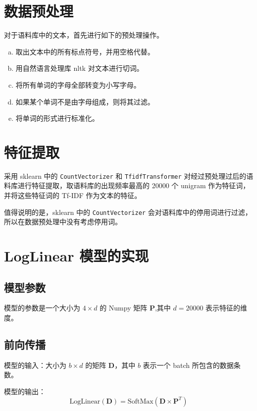 \documentclass[12pt,letterpaper]{article}
\begin{document}
\section{数据预处理}

对于语料库中的文本，首先进行如下的预处理操作。

\begin{enumerate}[a).]
    \item 取出文本中的所有标点符号，并用空格代替。
    \item 用自然语言处理库 nltk 对文本进行切词。
    \item 将所有单词的字母全部转变为小写字母。
    \item 如果某个单词不是由字母组成，则将其过滤。
    \item 将单词的形式进行标准化。
\end{enumerate}

\section{特征提取}

采用 sklearn 中的 \verb|CountVectorizer| 和 \verb|TfidfTransformer| 对经过预处理过后的语料库进行特征提取，取语料库的出现频率最高的 20000 个 unigram 作为特征词，并将这些特征词的 Tf-IDF 作为文本的特征。

值得说明的是，sklearn 中的 \verb|CountVectorizer| 会对语料库中的停用词进行过滤，所以在数据预处理中没有考虑停用词。

\section{LogLinear 模型的实现}

\subsection{模型参数}

模型的参数是一个大小为 $4 \times d$ 的 Numpy 矩阵 $\boldsymbol{P}$,其中 $d=20000$ 表示特征的维度。

\subsection{前向传播}

模型的输入：大小为 $b\times d$ 的矩阵 $\boldsymbol{D}$，其中 $b$ 表示一个 batch 所包含的数据条数。

模型的输出：
\begin{equation*}
    \mathrm{LogLinear(\boldsymbol{D})} = \mathrm{SoftMax}(\boldsymbol{D}\times \boldsymbol{P}^T)
\end{equation*}
\end{document}
